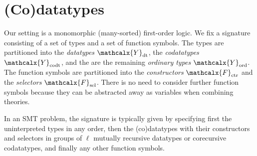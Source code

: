 \documentclass[letter]{article}
\theoremstyle{plain}
\theoremstyle{definition}
\newcommand\Sig{\mathrm{\Sigma}}
\newcommand\ty[1]{\textit{#1}}
\newcommand\Types{\mathcalx{Y}}
\newcommand\Funcs{\mathcalx{F}}
\newcommand\Data{\Types_{\mathrm{dt}}}
\newcommand\Codata{\Types_{\mathrm{codt}}}
\newcommand\Nondata{\Types_{\mathrm{ord}}}
\newcommand\Ctr{\Funcs_{\smash{\mathrm{ctr}}}}
\newcommand\Sel{\Funcs_{\smash{\mathrm{sel}}}}
\newcommand\vthinspace{\kern+0.083333em}
\begin{document}
\section{%
(Co)datatypes}
\label{sec:co-datatypes}

Our setting is a monomorphic (many-sorted) first-order logic.
We fix a signature %
consisting of a set of types and a
set of function symbols.
The types are partitioned into
the \emph{datatypes} $\Data$,
the \emph{codatatypes} $\Codata$,
and the are the remaining \emph{ordinary types} $\Nondata$.
The function symbols are
partitioned into the
\emph{constructors} $\Ctr$ and the \emph{selectors} $\Sel$.
There is no need to consider further function symbols because they can be
abstracted away as variables when combining theories.

In an SMT problem, the signature is typically given by specifying first the
uninterpreted %
types in any order, then the (co)datatypes with their constructors
and selectors in groups of $\ell$ mutually recursive datatypes or corecursive
codatatypes, and
finally any other function symbols.


\newcommand\elll{\kern.0515ex \ell\kern.0515ex}
\newcommand\elllx{\kern.0515ex \ell\kern.0515ex}
\end{document}
